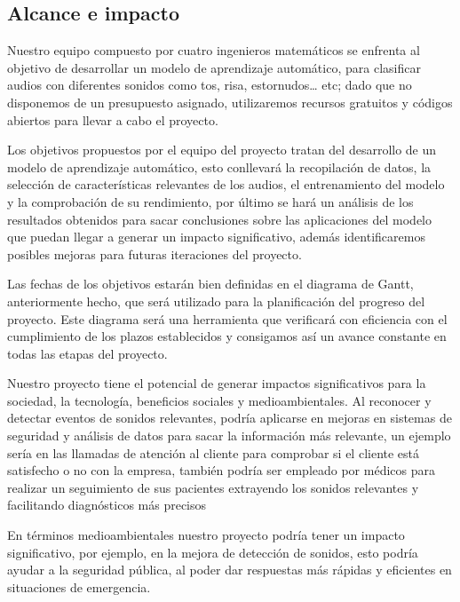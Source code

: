 \subsection{Alcance e impacto}
Nuestro equipo compuesto por cuatro ingenieros matemáticos se enfrenta al objetivo de desarrollar un modelo de aprendizaje automático, para clasificar audios con diferentes sonidos como tos, risa, estornudos… etc; dado que no disponemos de un presupuesto asignado, utilizaremos recursos gratuitos y códigos abiertos para llevar a cabo el proyecto.

Los objetivos propuestos por el equipo del proyecto tratan del desarrollo de un modelo de aprendizaje automático, esto conllevará  la recopilación de datos, la selección de características relevantes de los audios, el entrenamiento del modelo y la comprobación de su rendimiento, por último se hará un análisis de los resultados obtenidos para sacar conclusiones sobre las aplicaciones del modelo que puedan llegar a generar un impacto significativo, además identificaremos posibles mejoras para futuras iteraciones del proyecto.

Las fechas de los objetivos estarán bien definidas en el diagrama de Gantt, anteriormente hecho, que será utilizado para la planificación del progreso del proyecto. Este diagrama será una herramienta que verificará con eficiencia con el cumplimiento de los plazos establecidos y consigamos así un avance constante en todas las etapas del proyecto.

Nuestro proyecto tiene el potencial de generar impactos significativos para la sociedad, la tecnología, beneficios sociales y medioambientales. Al reconocer y detectar eventos de sonidos relevantes, podría aplicarse en mejoras en sistemas de seguridad y análisis de datos para sacar la información más relevante, un ejemplo sería en las llamadas de atención al cliente para comprobar si el cliente está satisfecho o no con la empresa, también podría ser empleado por médicos para realizar un seguimiento de sus pacientes extrayendo los sonidos relevantes y facilitando diagnósticos más precisos

En términos medioambientales nuestro proyecto podría tener un impacto significativo, por ejemplo, en la mejora de detección de sonidos, esto podría ayudar a la seguridad pública, al poder dar respuestas más rápidas y eficientes en situaciones de emergencia.

